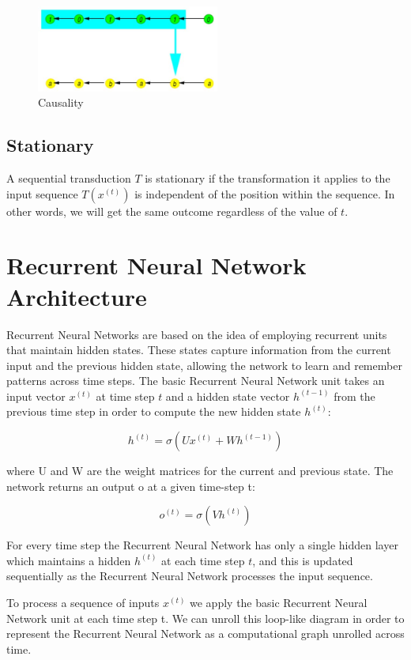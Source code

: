 \begin{figure}[h]
    \centering
    \includegraphics[width=6cm]{Images/causality.jpg}
    \caption{Causality}
    \label{fig:causality}
\end{figure}

\subsection{Stationary}

A sequential transduction $T$ is stationary if the transformation it applies to the input sequence $T(x^{(t)})$ is independent of the position within the sequence. In other words, we will get the same outcome regardless of the value of $t$.

\newpage
\section{Recurrent Neural Network Architecture}

Recurrent Neural Networks are based on the idea of employing recurrent units that maintain hidden states. These states capture information from the current input and the previous hidden state, allowing the network to learn and remember patterns across time steps. The basic Recurrent Neural Network unit takes an input vector $x^{(t)}$ at time step $t$ and a hidden state vector $h^{(t-1)}$ from the previous time step in order to compute the new hidden state $h^{(t)}$:

$$ h^{(t)} = \sigma \left( U x^{(t)} +  W h^{(t-1)} \right ) $$

\noindent where U and W are the weight matrices for the current and previous state. The network returns an output o at a given time-step t:

$$ o^{(t)} = \sigma \left( V h^{(t)} \right) $$

\noindent For every time step the Recurrent Neural Network has only a single hidden layer which maintains a hidden $ h^{(t)}$ at each time step $t$, and this is updated sequentially as the Recurrent Neural Network processes the input sequence.

\noindent To process a sequence of inputs $x^{(t)}$ we apply the basic Recurrent Neural Network unit at each time step t. We can unroll this loop-like diagram in order to represent the Recurrent Neural Network as a computational graph unrolled across time.

